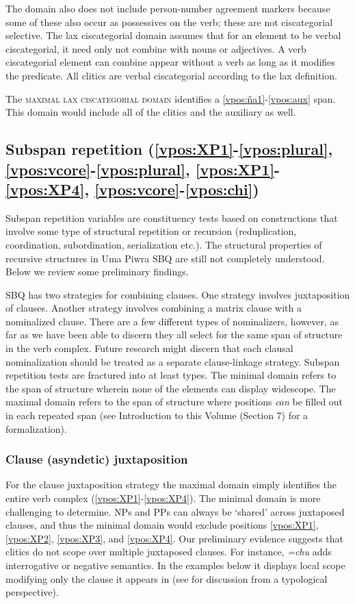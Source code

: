 \documentclass[output=paper]{langscibook}
\begin{document}
The domain also does not include person-number agreement markers because some of these also occur as possessives on the verb; these are not ciscategorial selective. The lax ciscategorial domain assumes that for an element to be verbal ciscategorial, it need only not combine with nouns or adjectives. A verb ciscategorial element can combine appear without a verb as long as it modifies the predicate. All clitics are verbal ciscategorial according to the lax definition.

The \textsc{maximal lax ciscategorial domain} identifies a \ref{vpos:ña1}-\ref{vpos:aux} span. This domain would include all of the clitics and the auxiliary as well. 


\subsection{Subspan repetition (\ref{vpos:XP1}-\ref{vpos:plural}, \ref{vpos:vcore}-\ref{vpos:plural}, \ref{vpos:XP1}-\ref{vpos:XP4}, \ref{vpos:vcore}-\ref{vpos:chi})}

Subspan repetition variables are constituency tests based on constructions that involve some type of structural repetition or recursion (reduplication, coordination, subordination, serialization etc.). The structural properties of recursive structures in Uma Piwra SBQ are still not completely understood. Below we review some preliminary findings.

SBQ has two strategies for combining clauses. One strategy involves juxtaposition of clauses. Another strategy involves combining a matrix clause with a nominalized clause. There are a few different types of nominalizers, however, as far as we have been able to discern they all select for the same span of structure in the verb complex. Future research might discern that each clausal nominalization should be treated as a separate clause-linkage strategy. Subspan repetition tests are fractured into at least types. The minimal domain refers to the span of structure wherein none of the elements can display widescope. The maximal domain refers to the span of structure where positions \textit{can} be filled out in each repeated span (see Introduction to this Volume (Section 7) for a formalization).

\subsubsection{Clause (asyndetic) juxtaposition}
\largerpage
For the clause juxtaposition strategy the maximal domain simply identifies the entire verb complex (\ref{vpos:XP1}-\ref{vpos:XP4}). The minimal domain is more challenging to determine. NPs and PPs can always be `shared' across juxtaposed clauses, and thus the minimal domain would exclude positions \ref{vpos:XP1}, \ref{vpos:XP2}, \ref{vpos:XP3}, and \ref{vpos:XP4}. Our preliminary evidence suggests that clitics do not scope over multiple juxtaposed clauses. For instance, \textit{=chu} adds interrogative or negative semantics. In the examples  below it displays local scope modifying only the clause it appears in (see \citealt{bickel:capturing} for discussion from a typological perspective).
\end{document}

